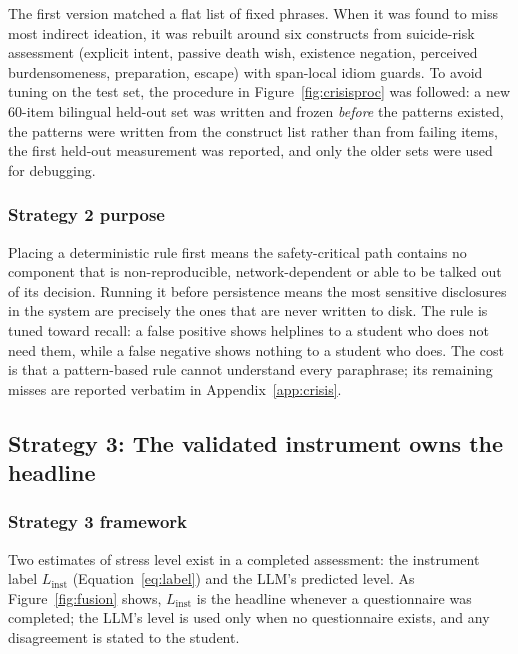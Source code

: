 The first version matched a flat list of fixed phrases. When it was found to miss most indirect ideation, it was rebuilt around six constructs from suicide-risk assessment (explicit intent, passive death wish, existence negation, perceived burdensomeness, preparation, escape) with span-local idiom guards. To avoid tuning on the test set, the procedure in Figure~\ref{fig:crisisproc} was followed: a new 60-item bilingual held-out set was written and frozen \textit{before} the patterns existed, the patterns were written from the construct list rather than from failing items, the first held-out measurement was reported, and only the older sets were used for debugging.


\subsubsection{Strategy 2 purpose}
Placing a deterministic rule first means the safety-critical path contains no component that is non-reproducible, network-dependent or able to be talked out of its decision. Running it before persistence means the most sensitive disclosures in the system are precisely the ones that are never written to disk. The rule is tuned toward recall: a false positive shows helplines to a student who does not need them, while a false negative shows nothing to a student who does. The cost is that a pattern-based rule cannot understand every paraphrase; its remaining misses are reported verbatim in Appendix~\ref{app:crisis}.

\subsection{Strategy 3: The validated instrument owns the headline}
\subsubsection{Strategy 3 framework}
Two estimates of stress level exist in a completed assessment: the instrument label $L_{\text{inst}}$ (Equation~\ref{eq:label}) and the LLM's predicted level. As Figure~\ref{fig:fusion} shows, $L_{\text{inst}}$ is the headline whenever a questionnaire was completed; the LLM's level is used only when no questionnaire exists, and any disagreement is stated to the student.


